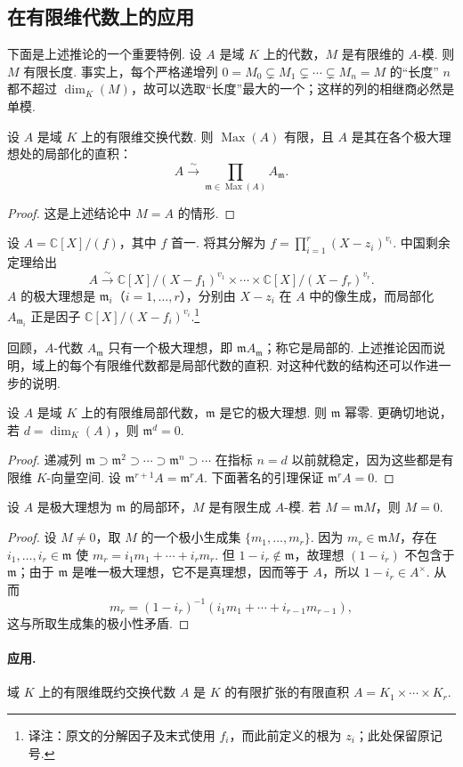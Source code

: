 \subsection{在有限维代数上的应用}\label{sec:galois-1-9-4}
下面是上述推论的一个重要特例. 设 $A$ 是域 $K$ 上的代数，$M$ 是有限维的 $A$-模. 则 $M$ 有限长度. 事实上，每个严格递增列 $0=M_0\subsetneq M_1\subsetneq\cdots\subsetneq M_n=M$ 的``长度'' $n$ 都不超过 $\dim_K(M)$，故可以选取``长度''最大的一个；这样的列的相继商必然是单模.
\begin{corollary*}
设 $A$ 是域 $K$ 上的有限维交换代数. 则 $\operatorname{Max}(A)$ 有限，且 $A$ 是其在各个极大理想处的局部化的直积：
\[A\xrightarrow{\sim}\prod_{\mathfrak m\in\operatorname{Max}(A)}A_{\mathfrak m}.\]
\end{corollary*}
\begin{proof}
这是上述结论中 $M=A$ 的情形.
\end{proof}
\begin{example*}
设 $A=\mathbb C[X]/(f)$，其中 $f$ 首一. 将其分解为 $f=\prod_{i=1}^r(X-z_i)^{v_i}$. 中国剩余定理给出
\[A\xrightarrow{\sim}\mathbb C[X]/(X-f_1)^{v_1}\times\cdots\times\mathbb C[X]/(X-f_r)^{v_r}.\]
$A$ 的极大理想是 $\mathfrak m_i$（$i=1,\ldots,r$），分别由 $X-z_i$ 在 $A$ 中的像生成，而局部化 $A_{\mathfrak m_i}$ 正是因子 $\mathbb C[X]/(X-f_i)^{v_i}$.\footnote{译注：原文的分解因子及末式使用 $f_i$，而此前定义的根为 $z_i$；此处保留原记号.}
\end{example*}
回顾，$A$-代数 $A_{\mathfrak m}$ 只有一个极大理想，即 $\mathfrak m A_{\mathfrak m}$；称它是局部的. 上述推论因而说明，域上的每个有限维代数都是局部代数的直积. 对这种代数的结构还可以作进一步的说明.
\begin{proposition*}
设 $A$ 是域 $K$ 上的有限维局部代数，$\mathfrak m$ 是它的极大理想. 则 $\mathfrak m$ 幂零. 更确切地说，若 $d=\dim_K(A)$，则 $\mathfrak m^d=0$.
\end{proposition*}
\begin{proof}
递减列 $\mathfrak m\supset\mathfrak m^2\supset\cdots\supset\mathfrak m^n\supset\cdots$ 在指标 $n=d$ 以前就稳定，因为这些都是有限维 $K$-向量空间. 设 $\mathfrak m^{r+1}A=\mathfrak m^rA$. 下面著名的引理保证 $\mathfrak m^rA=0$.
\end{proof}
\begin{lemma*}[{Nakayama 引理}]
设 $A$ 是极大理想为 $\mathfrak m$ 的局部环，$M$ 是有限生成 $A$-模. 若 $M=\mathfrak m M$，则 $M=0$.
\end{lemma*}
\begin{proof}
设 $M\ne0$，取 $M$ 的一个极小生成集 $\{m_1,\ldots,m_r\}$. 因为 $m_r\in\mathfrak m M$，存在 $i_1,\ldots,i_r\in\mathfrak m$ 使 $m_r=i_1m_1+\cdots+i_rm_r$. 但 $1-i_r\notin\mathfrak m$，故理想 $(1-i_r)$ 不包含于 $\mathfrak m$；由于 $\mathfrak m$ 是唯一极大理想，它不是真理想，因而等于 $A$，所以 $1-i_r\in A^\times$. 从而
\[m_r=(1-i_r)^{-1}(i_1m_1+\cdots+i_{r-1}m_{r-1}),\]
这与所取生成集的极小性矛盾.
\end{proof}
\paragraph{应用.} 域 $K$ 上的有限维既约交换代数 $A$ 是 $K$ 的有限扩张的有限直积 $A=K_1\times\cdots\times K_r$.

